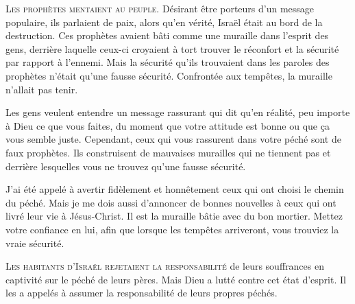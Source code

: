 \lettrine{L}{es prophètes mentaient au peuple.}
 Désirant être porteurs d'un message populaire, ils parlaient de paix,
 alors qu'en vérité, Israël était au bord de la destruction.
 Ces prophètes avaient bâti comme une \og muraille \fg{}
 dans l'esprit des gens, derrière laquelle 
 ceux-ci croyaient à tort trouver le réconfort et la sécurité par rapport
 à l'ennemi. Mais la sécurité qu'ils trouvaient dans les paroles
 des prophètes n'était qu'une fausse sécurité.
 Confrontée aux tempêtes, la \og muraille \fg{} n'allait pas tenir. 


Les gens veulent entendre un message rassurant qui dit
  qu'en réalité,
 peu importe à Dieu ce que vous faites, du moment que votre attitude est bonne
 ou que ça vous semble juste.
 Cependant, ceux qui vous rassurent dans votre péché sont de faux prophètes.
 Ils construisent de mauvaises murailles qui ne tiennent pas et
 derrière lesquelles 
 vous ne trouvez qu'une fausse sécurité. 

J'ai été appelé à avertir fidèlement et honnêtement ceux qui ont choisi
 le chemin du péché. Mais je me dois aussi d'annoncer de bonnes nouvelles
 à ceux qui ont livré leur vie à Jésus-Christ.
 Il est la muraille bâtie avec du bon mortier. Mettez votre confiance en lui,
 afin que lorsque les tempêtes arriveront, vous trouviez la vraie sécurité. 

\dvrule






\lettrine{L}{es habitants d'Israël rejetaient la responsabilité}
 de leurs souffrances en captivité sur le péché de leurs pères.
 Mais Dieu a lutté contre cet état d'esprit.
 Il les a appelés à assumer la responsabilité de leurs propres péchés. 

